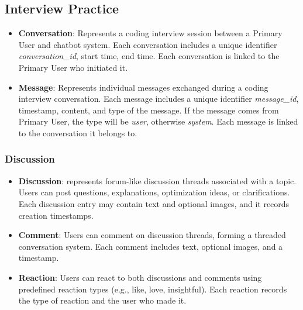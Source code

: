 \subsection*{Interview Practice}

\begin{itemize}
    \item \textbf{Conversation}: Represents a coding interview session between a Primary User and chatbot system. Each conversation includes a unique identifier \textit{conversation\_id}, start time, end time. Each conversation is linked to the Primary User who initiated it.
    \item \textbf{Message}: Represents individual messages exchanged during a coding interview conversation. Each message includes a unique identifier \textit{message\_id}, timestamp, content, and type of the message. If the message comes from Primary User, the type will be \textit{user}, otherwise \textit{system}. Each message is linked to the conversation it belongs to.
\end{itemize}

\subsubsection*{Discussion}
\begin{itemize}
    \item \textbf{Discussion}: represents forum-like discussion threads associated with a topic. Users can post questions, explanations, optimization ideas, or clarifications. Each discussion entry may contain text and optional images, and it records creation timestamps.
    \item \textbf{Comment}: Users can comment on discussion threads, forming a threaded conversation system. Each comment includes text, optional images, and a timestamp.
    \item \textbf{Reaction}: Users can react to both discussions and comments using predefined reaction types (e.g., like, love, insightful). Each reaction records the type of reaction and the user who made it.
\end{itemize}

